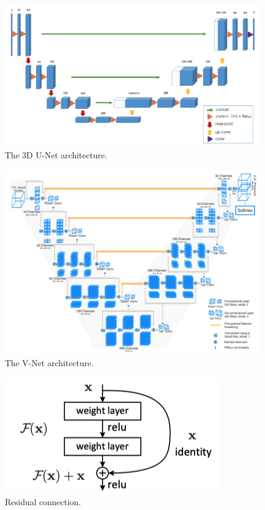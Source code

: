 \documentclass [11pt, proquest] {uwthesis}[2020/02/24]
\begin{document}
\begin{figure}
  \centering
  \includegraphics[width=0.8\linewidth]{figures/3dunet.png}
  \caption{The 3D U-Net architecture\cite{cicek_3d_2016}.}
  \label{3dunet}
\end{figure}

\begin{figure}
  \centering
  \includegraphics[width=1\linewidth]{figures/vnet.png}
  \caption{The V-Net architecture\cite{milletari_v-net_2016}.}
  \label{vnet}
\end{figure}


\begin{figure}
  \centering
  \includegraphics[width=0.4\linewidth]{figures/residual.png}
  \caption{Residual connection\cite{he_deep_2015}.}
  \label{residual}
\end{figure}
\end{document}
